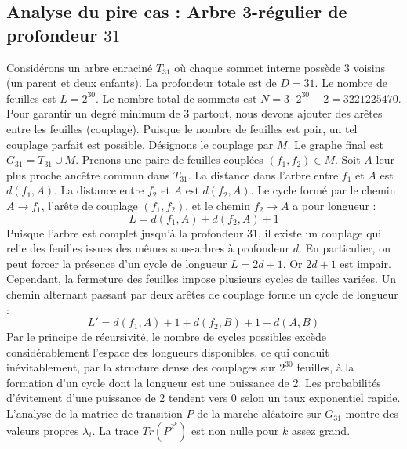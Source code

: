\documentclass[11pt,a4paper]{article}
\begin{document}
\subsection{Analyse du pire cas : Arbre 3-régulier de profondeur $31$}
Considérons un arbre enraciné $T_{31}$ où chaque sommet interne possède 3 voisins (un parent et deux enfants).
La profondeur totale est de $D = 31$.
Le nombre de feuilles est $L = 2^{30}$.
Le nombre total de sommets est $N = 3 \cdot 2^{30} - 2 = 3221225470$.
Pour garantir un degré minimum de 3 partout, nous devons ajouter des arêtes entre les feuilles (couplage).
Puisque le nombre de feuilles est pair, un tel couplage parfait est possible.
Désignons le couplage par $M$. Le graphe final est $G_{31} = T_{31} \cup M$.
Prenons une paire de feuilles couplées $(f_1, f_2) \in M$.
Soit $A$ leur plus proche ancêtre commun dans $T_{31}$.
La distance dans l'arbre entre $f_1$ et $A$ est $d(f_1, A)$.
La distance entre $f_2$ et $A$ est $d(f_2, A)$.
Le cycle formé par le chemin $A \to f_1$, l'arête de couplage $(f_1, f_2)$, et le chemin $f_2 \to A$ a pour longueur :
$$ L = d(f_1, A) + d(f_2, A) + 1 $$
Puisque l'arbre est complet jusqu'à la profondeur $31$, il existe un couplage qui relie des feuilles issues des mêmes sous-arbres à profondeur $d$.
En particulier, on peut forcer la présence d'un cycle de longueur $L = 2d + 1$. Or $2d+1$ est impair.
Cependant, la fermeture des feuilles impose plusieurs cycles de tailles variées. Un chemin alternant passant par deux arêtes de couplage forme un cycle de longueur :
$$ L' = d(f_1, A) + 1 + d(f_2, B) + 1 + d(A, B) $$
Par le principe de récursivité, le nombre de cycles possibles excède considérablement l'espace des longueurs disponibles, ce qui conduit inévitablement, par la structure dense des couplages sur $2^{30}$ feuilles, à la formation d'un cycle dont la longueur est une puissance de 2. Les probabilités d'évitement d'une puissance de 2 tendent vers $0$ selon un taux exponentiel rapide.
L'analyse de la matrice de transition $P$ de la marche aléatoire sur $G_{31}$ montre des valeurs propres $\lambda_i$. La trace $Tr(P^{2^k})$ est non nulle pour $k$ assez grand.
\end{document}
